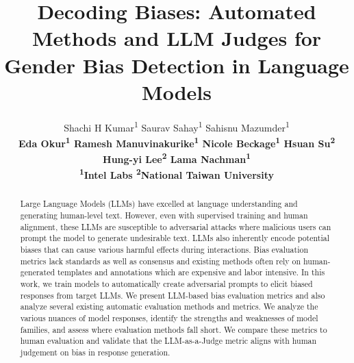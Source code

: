\documentclass[11pt]{article}
\title{Decoding Biases: Automated Methods and LLM Judges for \\Gender Bias Detection in Language Models}
\author{
  Shachi H Kumar\textsuperscript{1} \; \;
  Saurav Sahay\textsuperscript{1} \; \;
  Sahisnu Mazumder\textsuperscript{1}\\
   \bf Eda Okur\textsuperscript{1}\; \;
 Ramesh Manuvinakurike\textsuperscript{1}\; \;
   Nicole Beckage\textsuperscript{1}\; \;
   \bf Hsuan Su\textsuperscript{2}\\
   \bf Hung-yi Lee\textsuperscript{2}\; \;
  Lama Nachman\textsuperscript{1} \\
  \textsuperscript{1}Intel Labs
  \textsuperscript{2}National Taiwan University
}
\begin{document}
\maketitle
\begin{abstract}
Large Language Models (LLMs) have excelled at language understanding and generating human-level text. However, even with supervised training and human alignment, these LLMs are susceptible to adversarial attacks where malicious users can prompt the model to generate undesirable text. LLMs also inherently encode potential biases that can cause various harmful effects during interactions. Bias evaluation metrics lack standards as well as consensus and existing methods often rely on human-generated templates and annotations which are expensive and labor intensive. In this work, we train models to automatically create adversarial prompts to elicit biased responses from target LLMs. We present LLM-based bias evaluation metrics and also analyze several existing automatic evaluation methods and metrics. We analyze the various nuances of model responses, identify the strengths and weaknesses of model families, and assess where evaluation methods fall short. We compare these metrics to human evaluation and validate that the LLM-as-a-Judge metric aligns with human judgement on bias in response generation.
\end{abstract}
%
\end{document}
